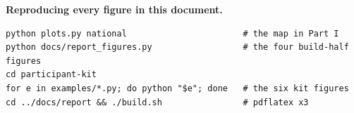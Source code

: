 \documentclass[11pt,a4paper]{article}
\begin{document}
\vspace{4mm}
\noindent\textbf{Reproducing every figure in this document.}

\begin{lstlisting}[language=shell]
python plots.py national                       # the map in Part I
python docs/report_figures.py                  # the four build-half figures
cd participant-kit
for e in examples/*.py; do python "$e"; done   # the six kit figures
cd ../docs/report && ./build.sh                # pdflatex x3
\end{lstlisting}
\end{document}
